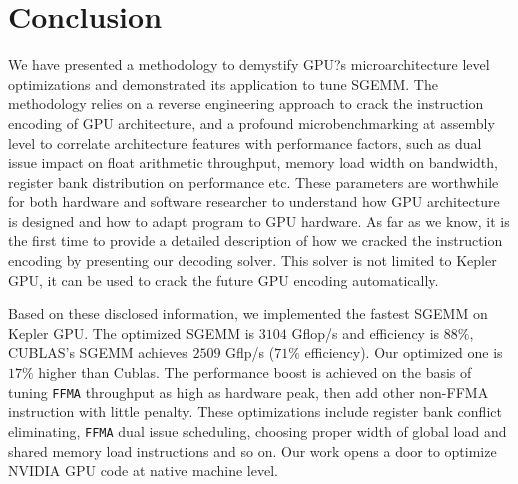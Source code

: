 \section{Conclusion}
\label{sec:conclusion}
We have presented a methodology to demystify GPU?s microarchitecture level optimizations and demonstrated its application to tune SGEMM. The methodology relies on a reverse engineering approach to crack the instruction encoding of GPU architecture, and a profound microbenchmarking at assembly level to correlate architecture features with performance factors, such as dual issue impact on float arithmetic throughput, memory load width on bandwidth, register bank distribution on performance etc. These parameters are worthwhile for both hardware and software researcher to understand how GPU architecture is designed and how to adapt program to GPU hardware. As far as we know, it is the first time to provide a detailed description of how we cracked the instruction encoding by presenting our decoding solver. This solver is not limited to Kepler GPU, it can be used to crack the future GPU encoding automatically. 

Based on these disclosed information, we implemented the fastest SGEMM on Kepler GPU. The optimized SGEMM is $3104$ Gflop/s and efficiency is $88\%$, CUBLAS's SGEMM achieves $2509$ Gflp/s ($71\%$ efficiency). Our optimized one is $17\%$ higher than Cublas. The performance boost is achieved on the basis of tuning {\tt FFMA} throughput as high as hardware peak, then add other non-FFMA instruction with little penalty. These optimizations include register bank conflict eliminating, {\tt FFMA} dual issue scheduling, choosing proper width of global load and shared memory load instructions and so on. Our work opens a door to optimize NVIDIA GPU code at native machine level.

